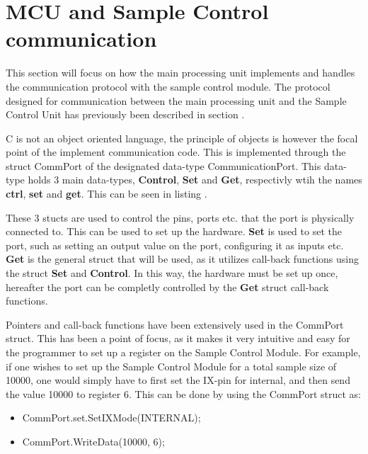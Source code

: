 \section{MCU and Sample Control communication} \label{subsec:MCUSCCommunication} 
This section will focus on how the main processing unit implements and handles the communication protocol with the sample control module. 
The protocol designed for communication between the main processing unit and the Sample Control Unit has previously been described in section .

C is not an object oriented language, the principle of objects is however the focal point of the implement communication code. This is implemented through the struct CommPort of the designated data-type CommunicationPort. This data-type holds 3 main data-types, \textbf{Control}, \textbf{Set} and \textbf{Get}, respectivly wtih the names \textbf{ctrl}, \textbf{set} and \textbf{get}. This can be seen in listing .



These 3 stucts are used to control the pins, ports etc. that the port is physically connected to. This can be used to set up the hardware. \textbf{Set} is used to set the port, such as setting an output value on the port, configuring it as inputs etc. \textbf{Get} is the general struct that will be used, as it utilizes call-back functions using the struct \textbf{Set} and \textbf{Control}. In this way, the hardware must be set up once, hereafter the port can be completly controlled by the \textbf{Get} struct call-back functions. 

Pointers and call-back functions have been extensively used in the CommPort struct. This has been a point of focus, as it makes it very intuitive and easy for the programmer to set up a register on the Sample Control Module. For example, if one wishes to set up the Sample Control Module for a total sample size of 10000, one would simply have to first set the IX-pin for internal, and then send the value 10000 to register 6. This can be done by using the CommPort struct as:

\begin{itemize}
    \item CommPort.set.SetIXMode(INTERNAL);
    \item CommPort.WriteData(10000, 6);
\end{itemize}

